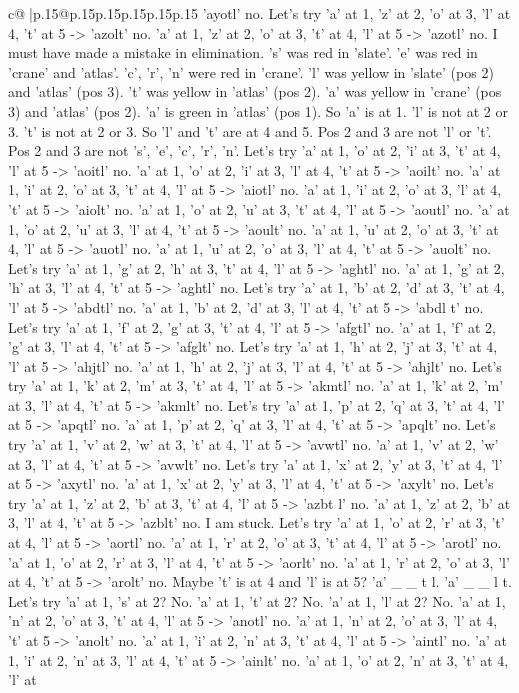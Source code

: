 \documentclass{article}
\begin{document}
{\begin{supertabular}{c@{$\;$}|p{.15\linewidth}@{}p{.15\linewidth}p{.15\linewidth}p{.15\linewidth}p{.15\linewidth}p{.15\linewidth}}
{{{'ayotl' no. Let's try 'a' at 1, 'z' at 2, 'o' at 3, 'l' at 4, 't' at 5 {-}> 'azolt' no. 'a' at 1, 'z' at 2, 'o' at 3, 't' at 4, 'l' at 5 {-}> 'azotl' no. I must have made a mistake in elimination. 's' was red in 'slate'. 'e' was red in 'crane' and 'atlas'. 'c', 'r', 'n' were red in 'crane'. 'l' was yellow in 'slate' (pos 2) and 'atlas' (pos 3). 't' was yellow in 'atlas' (pos 2). 'a' was yellow in 'crane' (pos 3) and 'atlas' (pos 2). 'a' is green in 'atlas' (pos 1). So 'a' is at 1. 'l' is not at 2 or 3. 't' is not at 2 or 3. So 'l' and 't' are at 4 and 5. Pos 2 and 3 are not 'l' or 't'. Pos 2 and 3 are not 's', 'e', 'c', 'r', 'n'. Let's try 'a' at 1, 'o' at 2, 'i' at 3, 't' at 4, 'l' at 5 {-}> 'aoitl' no. 'a' at 1, 'o' at 2, 'i' at 3, 'l' at 4, 't' at 5 {-}> 'aoilt' no. 'a' at 1, 'i' at 2, 'o' at 3, 't' at 4, 'l' at 5 {-}> 'aiotl' no. 'a' at 1, 'i' at 2, 'o' at 3, 'l' at 4, 't' at 5 {-}> 'aiolt' no. 'a' at 1, 'o' at 2, 'u' at 3, 't' at 4, 'l' at 5 {-}> 'aoutl' no. 'a' at 1, 'o' at 2, 'u' at 3, 'l' at 4, 't' at 5 {-}> 'aoult' no. 'a' at 1, 'u' at 2, 'o' at 3, 't' at 4, 'l' at 5 {-}> 'auotl' no. 'a' at 1, 'u' at 2, 'o' at 3, 'l' at 4, 't' at 5 {-}> 'auolt' no. Let's try 'a' at 1, 'g' at 2, 'h' at 3, 't' at 4, 'l' at 5 {-}> 'aghtl' no. 'a' at 1, 'g' at 2, 'h' at 3, 'l' at 4, 't' at 5 {-}> 'aghtl' no. Let's try 'a' at 1, 'b' at 2, 'd' at 3, 't' at 4, 'l' at 5 {-}> 'abdtl' no. 'a' at 1, 'b' at 2, 'd' at 3, 'l' at 4, 't' at 5 {-}> 'abdl t' no. Let's try 'a' at 1, 'f' at 2, 'g' at 3, 't' at 4, 'l' at 5 {-}> 'afgtl' no. 'a' at 1, 'f' at 2, 'g' at 3, 'l' at 4, 't' at 5 {-}> 'afglt' no. Let's try 'a' at 1, 'h' at 2, 'j' at 3, 't' at 4, 'l' at 5 {-}> 'ahjtl' no. 'a' at 1, 'h' at 2, 'j' at 3, 'l' at 4, 't' at 5 {-}> 'ahjlt' no. Let's try 'a' at 1, 'k' at 2, 'm' at 3, 't' at 4, 'l' at 5 {-}> 'akmtl' no. 'a' at 1, 'k' at 2, 'm' at 3, 'l' at 4, 't' at 5 {-}> 'akmlt' no. Let's try 'a' at 1, 'p' at 2, 'q' at 3, 't' at 4, 'l' at 5 {-}> 'apqtl' no. 'a' at 1, 'p' at 2, 'q' at 3, 'l' at 4, 't' at 5 {-}> 'apqlt' no. Let's try 'a' at 1, 'v' at 2, 'w' at 3, 't' at 4, 'l' at 5 {-}> 'avwtl' no. 'a' at 1, 'v' at 2, 'w' at 3, 'l' at 4, 't' at 5 {-}> 'avwlt' no. Let's try 'a' at 1, 'x' at 2, 'y' at 3, 't' at 4, 'l' at 5 {-}> 'axytl' no. 'a' at 1, 'x' at 2, 'y' at 3, 'l' at 4, 't' at 5 {-}> 'axylt' no. Let's try 'a' at 1, 'z' at 2, 'b' at 3, 't' at 4, 'l' at 5 {-}> 'azbt l' no. 'a' at 1, 'z' at 2, 'b' at 3, 'l' at 4, 't' at 5 {-}> 'azblt' no. I am stuck. Let's try 'a' at 1, 'o' at 2, 'r' at 3, 't' at 4, 'l' at 5 {-}> 'aortl' no. 'a' at 1, 'r' at 2, 'o' at 3, 't' at 4, 'l' at 5 {-}> 'arotl' no. 'a' at 1, 'o' at 2, 'r' at 3, 'l' at 4, 't' at 5 {-}> 'aorlt' no. 'a' at 1, 'r' at 2, 'o' at 3, 'l' at 4, 't' at 5 {-}> 'arolt' no. Maybe 't' is at 4 and 'l' is at 5? 'a' \_ \_ t l. 'a' \_ \_ l t. Let's try 'a' at 1, 's' at 2? No. 'a' at 1, 't' at 2? No. 'a' at 1, 'l' at 2? No. 'a' at 1, 'n' at 2, 'o' at 3, 't' at 4, 'l' at 5 {-}> 'anotl' no. 'a' at 1, 'n' at 2, 'o' at 3, 'l' at 4, 't' at 5 {-}> 'anolt' no. 'a' at 1, 'i' at 2, 'n' at 3, 't' at 4, 'l' at 5 {-}> 'aintl' no. 'a' at 1, 'i' at 2, 'n' at 3, 'l' at 4, 't' at 5 {-}> 'ainlt' no. 'a' at 1, 'o' at 2, 'n' at 3, 't' at 4, 'l' at }}}
\end{supertabular}}
\end{document}

